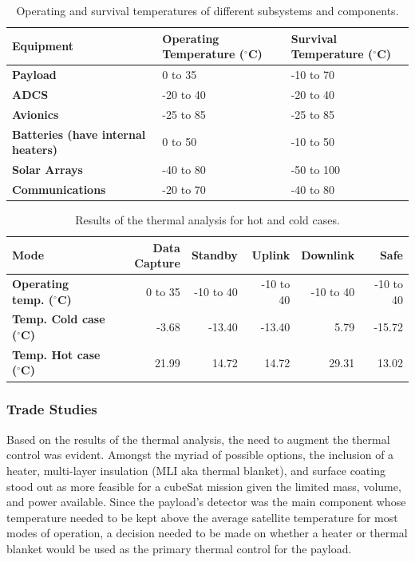 \documentclass[12pt]{article}
\begin{document}
\begin{table}[ht]%
\caption{Operating and survival temperatures of different subsystems and components.}
\label{table:thermal-inputs}
\begin{tabular}{|p{1.5in}|l|l|}\hline
\textbf{Equipment} & \textbf{Operating Temperature ($^\circ$C)} & \textbf{Survival Temperature ($^\circ$C)} \\\hline
\textbf{Payload} & 0 to 35 & -10 to 70 \\\hline
\textbf{ADCS} & -20 to 40 & -20 to 40 \\\hline
\textbf{Avionics} & -25 to 85 & -25 to 85\\\hline
\textbf{Batteries (have internal heaters)} & 0 to 50 & -10 to 50\\\hline
\textbf{Solar Arrays} & -40 to 80  & -50 to 100 \\\hline
\textbf{Communications} & -20 to 70 & -40 to 80 \\\hline
\end{tabular}
\end{table}

\begin{table}[ht]%
\caption{Results of the thermal analysis for hot and cold cases.}
\label{table:thermal-results}
\begin{tabular}{|l|r|r|r|r|r|}\hline
\textbf{Mode} & \textbf{Data Capture} & \textbf{Standby} & \textbf{Uplink} & \textbf{Downlink} & \textbf{Safe} \\\hline
\textbf{Operating temp. ($^\circ$C)} & 0 to 35 & -10 to 40 & -10 to 40 & -10 to 40 & -10 to 40 \\\hline
\textbf{Temp. Cold case ($^\circ$C)} & -3.68 & -13.40 & -13.40 & 5.79 & -15.72 \\\hline
\textbf{Temp. Hot case ($^\circ$C)} & 21.99 & 14.72 & 14.72 & 29.31 & 13.02 \\\hline
\end{tabular}
\end{table}

\subsubsection{Trade Studies}

Based on the results of the thermal analysis, the need to augment the thermal control was evident. Amongst the myriad of possible options, the inclusion of a heater, multi-layer insulation (MLI aka thermal blanket), and surface coating stood out as more feasible for a cubeSat mission given the limited mass, volume, and power available. Since the payload’s detector was the main component whose temperature needed to be kept above the average satellite temperature for most modes of operation, a decision needed to be made on whether  a heater or thermal blanket would be used as the primary thermal control for the payload.
\end{document}
